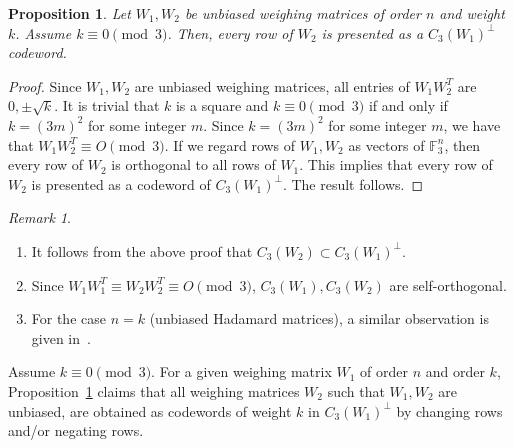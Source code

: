 \documentclass[12pt]{article}
\newtheorem{prop}[thm]{Proposition}
\theoremstyle{remark}
\newtheorem{rem}[thm]{Remark}
\newcommand{\FF}{\mathbb{F}}
\begin{document}
\begin{prop}\label{prop:code}
Let $W_1, W_2$ be unbiased weighing matrices of order $n$ and weight $k$.
Assume $k \equiv 0 \pmod 3$.
Then, every row of $W_2$ is presented as a $C_3(W_1)^\perp$ codeword.
\end{prop}
\begin{proof}
Since $W_1,W_2$ are unbiased weighing matrices,
all entries of $W_1W_2^T$ are $0, \pm \sqrt{k}$.
It is trivial that $k$ is a square and $k \equiv 0 \pmod 3$ if and only if
$k=(3m)^2$ for some integer $m$.
Since $k=(3m)^2$ for some integer $m$,
we have that $W_1W_2^T \equiv O \pmod{3}$.
If we regard rows of $W_1,W_2$ as vectors of $\FF_3^n$,
then every row of $W_2$ is orthogonal to all rows of $W_1$.
This implies
that every row of $W_2$ is presented as a codeword of $C_3(W_1)^\perp$.
The result follows.
\end{proof}

\begin{rem}
\begin{enumerate}
\item It follows from the above proof that $C_3(W_2) \subset C_3(W_1)^\perp$.
\item Since $W_1W_1^T \equiv W_2W_2^T \equiv O \pmod 3$, 
$C_3(W_1), C_3(W_2)$ are self-orthogonal.
\item For the case $n=k$ (unbiased Hadamard matrices), 
a similar observation is given in~\cite{HK}.
\end{enumerate}
\end{rem}

Assume $k \equiv 0 \pmod 3$.
For a given weighing matrix $W_1$ of order $n$ and order $k$,
Proposition~\ref{prop:code} claims that
all weighing matrices $W_2$ such that $W_1,W_2$ are unbiased, 
are obtained as codewords of weight $k$ in $C_3(W_1)^\perp$ 
by changing rows and/or negating rows.


\end{document}
